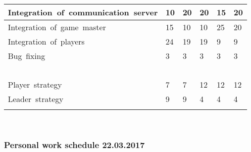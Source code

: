 \documentclass[11pt,a4paper]{article}
\begin{document}
\begin{tabular}{ | p{4cm} | p{2cm} | p{2cm} | p{2cm} | p{2cm} | p{2cm} | }
	Integration\ of\ communication\ server & 10 & 20 & 20 & 15 & 20   \\ \hline
	Integration\ of\ game\ master & 15 & 10 & 10 & 25 & 20    \\ \hline
	Integration\ of\ players & 24 & 19 & 19 & 9 & 9    \\ \hline
	Bug\ fixing & 3 & 3 & 3 & 3 & 3   \\ \hline
	\  & \  & \  & \  & \  &   \\ \hline
	Player\ strategy & 7 & 7 & 12 & 12 & 12   \\ \hline
	Leader\ strategy & 9 & 9 & 4 & 4 & 4 \\ \hline
	 &  &  &  &  &  \\ \hline
\end{tabular} \\

\subsubsection{Personal work schedule 22.03.2017}
\end{document}
